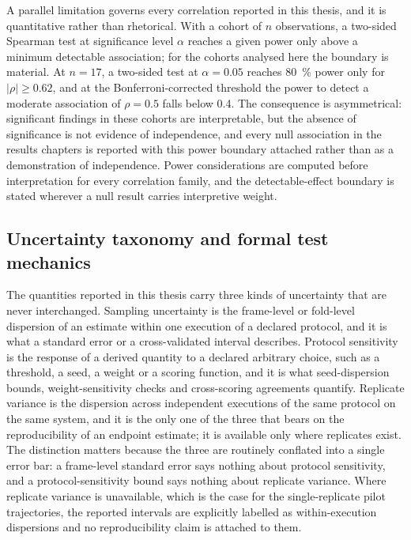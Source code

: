 A parallel limitation governs every correlation reported in this thesis, and it is quantitative rather than rhetorical. With a cohort of $n$ observations, a two-sided Spearman test at significance level $\alpha$ reaches a given power only above a minimum detectable association; for the cohorts analysed here the boundary is material. At $n = \num{17}$, a two-sided test at $\alpha = \num{0.05}$ reaches \qty{80}{\percent} power only for $|\rho| \geq \num{0.62}$, and at the Bonferroni-corrected threshold the power to detect a moderate association of $\rho = \num{0.5}$ falls below \num{0.4}. The consequence is asymmetrical: significant findings in these cohorts are interpretable, but the absence of significance is not evidence of independence, and every null association in the results chapters is reported with this power boundary attached rather than as a demonstration of independence. Power considerations are computed before interpretation for every correlation family, and the detectable-effect boundary is stated wherever a null result carries interpretive weight.

\subsection{Uncertainty taxonomy and formal test mechanics}

The quantities reported in this thesis carry three kinds of uncertainty that are never interchanged. Sampling uncertainty is the frame-level or fold-level dispersion of an estimate within one execution of a declared protocol, and it is what a standard error or a cross-validated interval describes. Protocol sensitivity is the response of a derived quantity to a declared arbitrary choice, such as a threshold, a seed, a weight or a scoring function, and it is what seed-dispersion bounds, weight-sensitivity checks and cross-scoring agreements quantify. Replicate variance is the dispersion across independent executions of the same protocol on the same system, and it is the only one of the three that bears on the reproducibility of an endpoint estimate; it is available only where replicates exist. The distinction matters because the three are routinely conflated into a single error bar: a frame-level standard error says nothing about protocol sensitivity, and a protocol-sensitivity bound says nothing about replicate variance. Where replicate variance is unavailable, which is the case for the single-replicate pilot trajectories, the reported intervals are explicitly labelled as within-execution dispersions and no reproducibility claim is attached to them.

